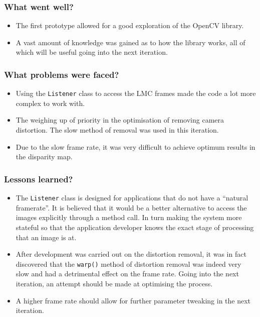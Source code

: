 \documentclass[11pt,oneside]{report}
\newcommand\code[1]{\texttt{#1}}
\begin{document}
		\subsubsection{What went well?}
		\begin{itemize}
			\item The first prototype allowed for a good exploration of the OpenCV library.
			\item A vast amount of knowledge was gained as to how the library works, all of which will be useful going into the next iteration.
		\end{itemize}
		
		
		\subsubsection{What problems were faced?}
		\begin{itemize}
			\item Using the \code{Listener} class to access the LMC frames made the code a lot more complex to work with.
			\item The weighing up of priority in the optimisation of removing camera distortion. The slow method of removal was used in this iteration.
			\item Due to the slow frame rate, it was very difficult to achieve optimum results in the disparity map.
		\end{itemize}				
		\subsubsection{Lessons learned?}
			\begin{itemize}
				\item The \code{Listener} class is designed for applications that do not have a ``natural framerate''. It is believed that it would be a better alternative to access the images explicitly through a method call. In turn making the system more stateful so that the application developer knows the exact stage of processing that an image is at.
				\item After development was carried out on the distortion removal, it was in fact discovered that the \code{warp()} method of distortion removal was indeed very slow and had a detrimental effect on the frame rate. Going into the next iteration, an attempt should be made at optimising the process.
				\item A higher frame rate should allow for further parameter tweaking in the next iteration.
			\end{itemize}
			
\end{document}
